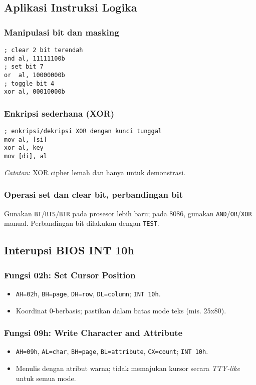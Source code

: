 \subsection{Aplikasi Instruksi Logika}
\subsubsection{Manipulasi bit dan masking}
\begin{verbatim}
; clear 2 bit terendah
and al, 11111100b
; set bit 7
or  al, 10000000b
; toggle bit 4
xor al, 00010000b
\end{verbatim}

\subsubsection{Enkripsi sederhana (XOR)}
\begin{verbatim}
; enkripsi/dekripsi XOR dengan kunci tunggal
mov al, [si]
xor al, key
mov [di], al
\end{verbatim}
\textit{Catatan}: XOR cipher lemah dan hanya untuk demonstrasi.

\subsubsection{Operasi set dan clear bit, perbandingan bit}
Gunakan \texttt{BT}/\texttt{BTS}/\texttt{BTR} pada prosesor lebih baru; pada 8086, gunakan \texttt{AND}/\texttt{OR}/\texttt{XOR} manual. Perbandingan bit dilakukan dengan \texttt{TEST}.

\subsection{Interupsi BIOS INT 10h}
\subsubsection{Fungsi 02h: Set Cursor Position}
\begin{itemize}
  \item \texttt{AH=02h}, \texttt{BH=page}, \texttt{DH=row}, \texttt{DL=column}; \texttt{INT 10h}.
  \item Koordinat 0-berbasis; pastikan dalam batas mode teks (mis. 25x80).
\end{itemize}
\subsubsection{Fungsi 09h: Write Character and Attribute}
\begin{itemize}
  \item \texttt{AH=09h}, \texttt{AL=char}, \texttt{BH=page}, \texttt{BL=attribute}, \texttt{CX=count}; \texttt{INT 10h}.
  \item Menulis dengan atribut warna; tidak memajukan kursor secara \textit{TTY-like} untuk semua mode.
\end{itemize}
